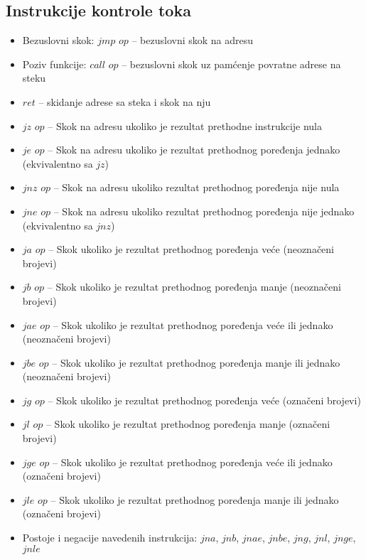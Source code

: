 \documentclass[a4paper, 10pt]{article}
\begin{document}
	\subsection{Instrukcije kontrole toka}
	\begin{itemize}
		\item Bezuslovni skok: $jmp$ $op$ -- bezuslovni skok na adresu
		\item Poziv funkcije: $call$ $op$ -- bezuslovni skok uz pamćenje povratne adrese na steku
		\item $ret$ -- skidanje adrese sa steka i skok na nju
		\item $jz$ $op$ -- Skok na adresu ukoliko je rezultat prethodne instrukcije nula
		\item $je$ $op$ -- Skok na adresu ukoliko je rezultat prethodnog poređenja jednako (ekvivalentno sa $jz$)
		\item $jnz$ $op$ -- Skok na adresu ukoliko rezultat prethodnog poređenja nije nula
		\item $jne$ $op$ -- Skok na adresu ukoliko rezultat prethodnog poređenja nije jednako (ekvivalentno sa $jnz$)
		\item $ja$ $op$ -- Skok ukoliko je rezultat prethodnog poređenja veće (neoznačeni brojevi)
		\item $jb$ $op$ -- Skok ukoliko je rezultat prethodnog poređenja manje (neoznačeni brojevi)
		\item $jae$ $op$ -- Skok ukoliko je rezultat prethodnog poređenja veće ili jednako (neoznačeni brojevi)
		\item $jbe$ $op$ -- Skok ukoliko je rezultat prethodnog poređenja manje ili jednako (neoznačeni brojevi)
		\item $jg$ $op$ -- Skok ukoliko je rezultat prethodnog poređenja veće (označeni brojevi)
		\item $jl$ $op$ -- Skok ukoliko je rezultat prethodnog poređenja manje (označeni brojevi)
		\item $jge$ $op$ -- Skok ukoliko je rezultat prethodnog poređenja veće ili jednako (označeni brojevi)
		\item $jle$ $op$ -- Skok ukoliko je rezultat prethodnog poređenja manje ili jednako (označeni brojevi)
		\item Postoje i negacije navedenih instrukcija: $jna$, $jnb$, $jnae$, $jnbe$, $jng$, $jnl$, $jnge$, $jnle$
	\end{itemize}
\end{document}
